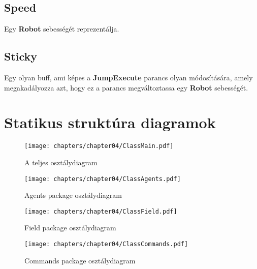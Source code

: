 \subsection{Speed}
Egy \textbf{Robot} sebességét reprezentálja.

\subsection{Sticky}
Egy olyan buff, ami képes a \textbf{JumpExecute} parancs olyan módosítására, amely megakadályozza azt, hogy ez a parancs megváltoztassa egy \textbf{Robot} sebességét.

\clearpage

\section{Statikus struktúra diagramok}

\begin{figure}[h]
	\begin{center}
		\texttt{[image: chapters/chapter04/ClassMain.pdf]}
		\caption{A teljes osztálydiagram}
		\label{A teljes osztálydiagram}
	\end{center}
\end{figure}

\begin{figure}[h]
	\begin{center}
		\texttt{[image: chapters/chapter04/ClassAgents.pdf]}
		\caption{Agents package osztálydiagram}
		\label{Agents package osztálydiagram}
	\end{center}
\end{figure}

\begin{figure}[h]
	\begin{center}
		\texttt{[image: chapters/chapter04/ClassField.pdf]}
		\caption{Field package osztálydiagram}
		\label{Field package osztálydiagram}
	\end{center}
\end{figure}

\clearpage

\begin{figure}[h]
	\begin{center}
		\texttt{[image: chapters/chapter04/ClassCommands.pdf]}
		\caption{Commands package osztálydiagram}
		\label{Commands package osztálydiagram}
	\end{center}
\end{figure}


